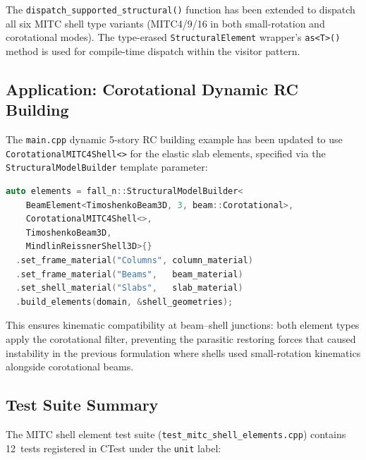 The \texttt{dispatch\_supported\_structural()} function has been
extended to dispatch all six MITC shell type variants
(MITC4/9/16 in both small-rotation and corotational modes).  The
type-erased \texttt{StructuralElement} wrapper's \texttt{as<T>()}
method is used for compile-time dispatch within the visitor pattern.

\subsection{Application: Corotational Dynamic RC Building}
\label{sec:cr-application}

The \texttt{main.cpp} dynamic 5-story RC building example has been
updated to use \texttt{CorotationalMITC4Shell<>} for the elastic
slab elements, specified via the \texttt{StructuralModelBuilder}
template parameter:

\begin{lstlisting}[language=C++, basicstyle=\small\ttfamily]
auto elements = fall_n::StructuralModelBuilder<
    BeamElement<TimoshenkoBeam3D, 3, beam::Corotational>,
    CorotationalMITC4Shell<>,
    TimoshenkoBeam3D,
    MindlinReissnerShell3D>{}
  .set_frame_material("Columns", column_material)
  .set_frame_material("Beams",   beam_material)
  .set_shell_material("Slabs",   slab_material)
  .build_elements(domain, &shell_geometries);
\end{lstlisting}

This ensures kinematic compatibility at beam--shell junctions:
both element types apply the corotational filter, preventing the
parasitic restoring forces that caused instability in the previous
formulation where shells used small-rotation kinematics alongside
corotational beams.

\subsection{Test Suite Summary}
\label{sec:mitc-tests}

The MITC shell element test suite (\texttt{test\_mitc\_shell\_elements.cpp})
contains 12~tests registered in CTest under the \texttt{unit} label:

